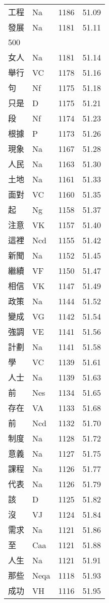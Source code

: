 \documentclass[twocolumn]{book}
\begin{document}
\begin{supertabular}{llrr}
工程 & Na & 1186 &  51.09\\
發展 & Na & 1181 &  51.11\\
500\\
女人 & Na & 1181 &  51.14\\
舉行 & VC & 1178 &  51.16\\
句 & Nf & 1175 &  51.18\\
只是 & D & 1175 &  51.21\\
段 & Nf & 1174 &  51.23\\
根據 & P & 1173 &  51.26\\
現象 & Na & 1167 &  51.28\\
人民 & Na & 1163 &  51.30\\
土地 & Na & 1161 &  51.33\\
面對 & VC & 1160 &  51.35\\
起 & Ng & 1158 &  51.37\\
注意 & VK & 1157 &  51.40\\
這裡 & Ncd & 1155 &  51.42\\
新聞 & Na & 1152 &  51.45\\
繼續 & VF & 1150 &  51.47\\
相信 & VK & 1147 &  51.49\\
政策 & Na & 1144 &  51.52\\
變成 & VG & 1142 &  51.54\\
強調 & VE & 1141 &  51.56\\
計劃 & Na & 1141 &  51.58\\
學 & VC & 1139 &  51.61\\
人士 & Na & 1139 &  51.63\\
前 & Nes & 1134 &  51.65\\
存在 & VA & 1133 &  51.68\\
前 & Ncd & 1132 &  51.70\\
制度 & Na & 1128 &  51.72\\
意義 & Na & 1127 &  51.75\\
課程 & Na & 1126 &  51.77\\
代表 & Na & 1126 &  51.79\\
該 & D & 1125 &  51.82\\
沒 & VJ & 1124 &  51.84\\
需求 & Na & 1121 &  51.86\\
至 & Caa & 1121 &  51.88\\
人生 & Na & 1121 &  51.91\\
那些 & Neqa & 1118 &  51.93\\
成功 & VH & 1116 &  51.95\\

\end{supertabular}
\end{document}
